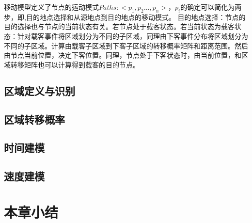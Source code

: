移动模型定义了节点的运动模式$Paths:<p_1,p_2…,p_n>$，$p_i$的确定可以简化为两步，即,目的地点选择和从源地点到目的地点的移动模式。
目的地点选择：节点的目的选择也与节点的当前状态有关。若节点处于载客状态。若当前状态为载客状态：针对载客事件将区域划分为不同的子区域，同理由下客事件分布将区域划分为不同的子区域。计算由载客子区域到下客子区域的转移概率矩阵和距离范围。然后由节点当前位置，决定下客位置。同理，节点处于下客状态时，由当前位置，和区域转移矩阵也可以计算得到载客的目的节点。


\subsection{区域定义与识别}


\subsection{区域转移概率}


\subsection{时间建模}


\subsection{速度建模}


\section{本章小结}

